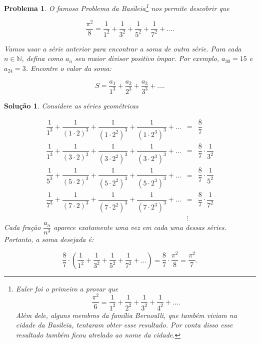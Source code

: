\documentclass{hipatia}
\newtheorem{problem*}{Problema}
\newtheorem*{solution*}{Solução}
\begin{document}
\begin{problem*}
O famoso {\it Problema da Basileia}\footnote{Euler foi o primeiro a provar que $$\dfrac{\pi^2}{6} = \dfrac{1}{1^2}+\dfrac{1}{2^2}+\dfrac{1}{3^2}+\dfrac{1}{4^2}+\ldots .$$ Além dele, alguns membros da família Bernoulli, que também viviam na cidade da Basileia, tentaram obter esse resultado. Por conta disso esse resultado também ficou atrelado ao nome da cidade. } nos permite descobrir que 

$$\dfrac{\pi^2}{8} = \dfrac{1}{1^2}+\dfrac{1}{3^2}+\dfrac{1}{5^2}+\dfrac{1}{7^2}+\ldots .$$

\noindent Vamos usar a série anterior para encontrar a soma de outra série. Para cada $n \in \mathbb{N}$, defina como $a_n$ seu maior divisor positivo ímpar. Por exemplo, $a_{30} = 15$ e $a_{24}=3$. Encontre o valor da soma:

$$S = \dfrac{a_1}{1^3}+\dfrac{a_2}{2^3}+\dfrac{a_3}{3^3}+\ldots .$$
\end{problem*}

\begin{solution*}
Considere as séries geométricas

\begin{eqnarray*}
\dfrac{1}{1^3}+\dfrac{1}{(1\cdot 2)^3}+\dfrac{1}{(1\cdot 2^2)^3}+\dfrac{1}{(1\cdot 2^3)^3} + \ldots  & = & \dfrac{8}{7} \\
\dfrac{1}{1^3}+\dfrac{1}{(3\cdot 2)^3}+\dfrac{1}{(3\cdot 2^2)^3}+\dfrac{1}{(3\cdot 2^3)^3} + \ldots  & = & \dfrac{8}{7} \cdot \dfrac{1}{3^2} \\
\dfrac{1}{5^3}+\dfrac{1}{(5\cdot 2)^3}+\dfrac{1}{(5\cdot 2^2)^3}+\dfrac{1}{(5\cdot 2^3)^3} + \ldots  & = & \dfrac{8}{7} \cdot \dfrac{1}{5^2} \\  
\dfrac{1}{7^3}+\dfrac{1}{(7\cdot 2)^3}+\dfrac{1}{(7\cdot 2^2)^3}+\dfrac{1}{(7\cdot 2^3)^3} + \ldots  & = & \dfrac{8}{7} \cdot \dfrac{1}{7^2} \\
                  & \vdots & 
\end{eqnarray*}
Cada fração $\dfrac{a_n}{n^3}$ aparece exatamente uma vez em cada uma dessas séries. Portanto, a soma desejada é:

$$\dfrac{8}{7} \cdot \left ( \dfrac{1}{1^2}+ \dfrac{1}{3^2}+\dfrac{1}{5^2}+\dfrac{1}{7^2} + \ldots \right ) = \dfrac{8}{7} \cdot \dfrac{\pi^2}{8} =\dfrac{\pi^2}{7}.$$
\end{solution*}
\end{document}
